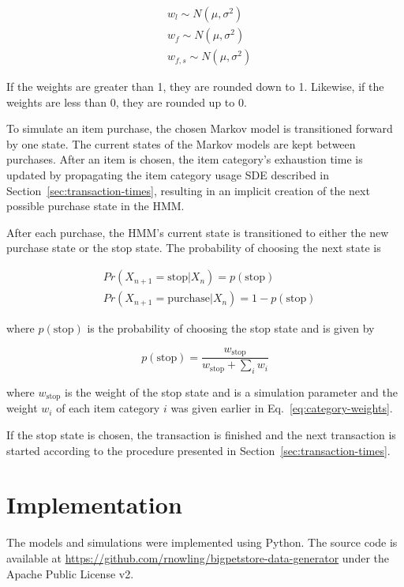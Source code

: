 \begin{align*}
&w_l \sim N(\mu, \sigma^2) \\
&w_f \sim N(\mu, \sigma^2) \\
&w_{f, s} \sim N(\mu, \sigma^2)
\end{align*}

If the weights are greater than 1, they are rounded down to 1.  Likewise, if the weights are less than 0, they are rounded up to 0.

To simulate an item purchase, the chosen Markov model is transitioned forward by one state. The current states of the Markov models are kept between purchases.  After an item is chosen, the item category's exhaustion time is updated by propagating the item category usage SDE described in Section~\ref{sec:transaction-times}, resulting in an implicit creation of the next possible purchase state in the HMM.

After each purchase, the HMM's current state is transitioned to either the new purchase state or the stop state.  The probability of choosing the next state is 

\begin{align*}
&Pr(X_{n+1}=\text{stop}|X_n) = p(\text{stop})\\
&Pr(X_{n+1}=\text{purchase}|X_n) = 1 - p(\text{stop})
\end{align*}

where $p(\text{stop})$ is the probability of choosing the stop state and is given by

\begin{equation*}
 p(\text{stop}) = \frac{w_{\text{stop}}}{w_{\text{stop}} + \sum_i w_i}
\end{equation*}

where $w_{\text{stop}}$ is the weight of the stop state and is a simulation parameter and the weight $w_i$ of each item category $i$ was given earlier in Eq.~\ref{eq:category-weights}.

If the stop state is chosen, the transaction is finished and the next transaction is started according to the procedure presented in Section~\ref{sec:transaction-times}.


\section{Implementation}
The models and simulations were implemented using Python. The source code is available at \url{https://github.com/rnowling/bigpetstore-data-generator} under the Apache Public License v2.

